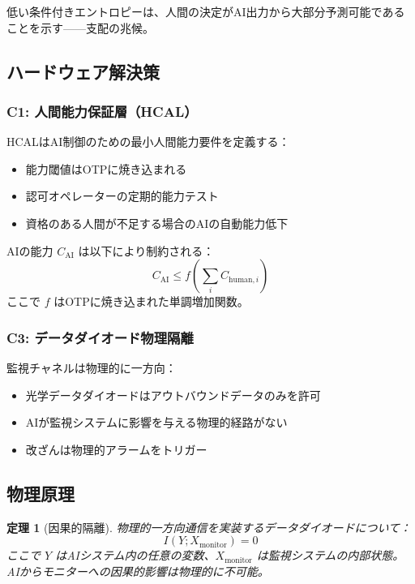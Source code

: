 \documentclass[11pt,a4paper]{article}
\newtheorem{theorem}{定理}
\begin{document}
低い条件付きエントロピーは、人間の決定がAI出力から大部分予測可能であることを示す——支配の兆候。

\subsection{ハードウェア解決策}

\subsubsection{C1: 人間能力保証層（HCAL）}

HCALはAI制御のための最小人間能力要件を定義する：
\begin{itemize}
    \item 能力閾値はOTPに焼き込まれる
    \item 認可オペレーターの定期的能力テスト
    \item 資格のある人間が不足する場合のAIの自動能力低下
\end{itemize}

AIの能力 $C_{\text{AI}}$ は以下により制約される：
\begin{equation}
C_{\text{AI}} \leq f(\sum_{i} C_{\text{human},i})
\end{equation}
ここで $f$ はOTPに焼き込まれた単調増加関数。

\subsubsection{C3: データダイオード物理隔離}

監視チャネルは物理的に一方向：
\begin{itemize}
    \item 光学データダイオードはアウトバウンドデータのみを許可
    \item AIが監視システムに影響を与える物理的経路がない
    \item 改ざんは物理的アラームをトリガー
\end{itemize}

\subsection{物理原理}

\begin{theorem}[因果的隔離]
物理的一方向通信を実装するデータダイオードについて：
\begin{equation}
I(Y; X_{\text{monitor}}) = 0
\end{equation}
ここで $Y$ はAIシステム内の任意の変数、$X_{\text{monitor}}$ は監視システムの内部状態。
AIからモニターへの因果的影響は物理的に不可能。
\end{theorem}
\end{document}
